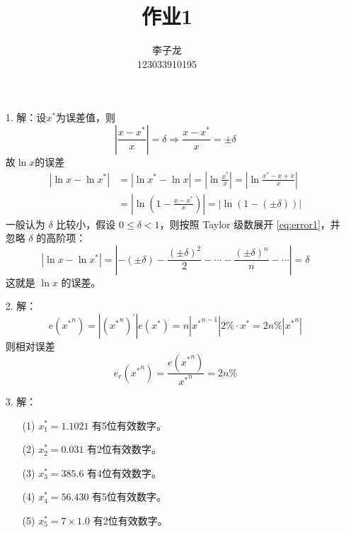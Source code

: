 \documentclass{sjtuarticle}
\title{作业1}
\author{李子龙\\123033910195}
\begin{document}
\maketitle
\begin{itemize}
    \item[1.] 解：设$x^*$为误差值，则
    \begin{equation*}
        \left\lvert\frac{x-x^*}{x}\right\rvert=\delta\Rightarrow \frac{x-x^*}{x}=\pm \delta
    \end{equation*}
    故$\ln x$的误差
    \begin{equation}\label{eq:error1}
        \begin{aligned}
            \left|\ln x-\ln x^*\right|&=\left|\ln x^*-\ln x\right|=\left\lvert\ln\frac{x^*}{x}\right\rvert=\left|\ln\frac{x^*-x+x}{x}\right|\\
            &=\left|\ln\left(1-\frac{x-x^*}{x}\right)\right|
            =\left|\ln(1-(\pm \delta))\right|
        \end{aligned}
    \end{equation}
    一般认为 $\delta$ 比较小，假设 $0\leq\delta<1$，则按照 Taylor 级数展开 \eqref{eq:error1}，并忽略 $\delta$ 的高阶项：
    \begin{equation*}
        |\ln x-\ln x^*|=\left|-(\pm \delta)-\frac{(\pm \delta)^2}{2}-\cdots-\frac{(\pm \delta)^n}{n}-\cdots\right|=\delta
    \end{equation*}
    这就是 $\ln x$ 的误差。
    \item[2.] 解：\begin{equation*}
        e({x^*}^n)=|({x^*}^n)^\prime|e(x^*)=n|{x^*}^{n-1}|2\%\cdot x^*=2n\%|{x^*}^n|
    \end{equation*}
    则相对误差
    \begin{equation*}
        e_r({x^*}^n)=\frac{e({x^*}^n)}{{x^*}^n}=2n\%
    \end{equation*}
    \item[3.] 解：
        \begin{itemize}
            \item[(1)] $x_1^*=1.1021$ 有5位有效数字。
            \item[(2)] $x_2^*=0.031$ 有2位有效数字。
            \item[(3)] $x_3^*=385.6$ 有4位有效数字。
            \item[(4)] $x_4^*=56.430$ 有5位有效数字。
            \item[(5)] $x_5^*=7\times 1.0$ 有2位有效数字。   
        \end{itemize}

\end{itemize}
\end{document}
